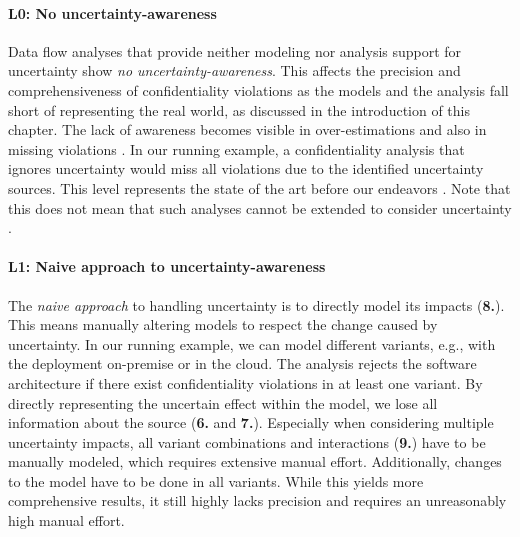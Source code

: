 \paragraph{L0: No uncertainty-awareness}\label{awarenesslevel:0}
Data flow analyses that provide neither modeling nor analysis support for uncertainty show \emph{no uncertainty-awareness}.
This affects the precision and comprehensiveness \cite{hahner_architectural_2021} of confidentiality violations as the models and the analysis fall short of representing the real world, as discussed in the introduction of this chapter.
The lack of awareness becomes visible in over-estimations and also in missing violations \cite{seifermann_architectural_2022}.
In our running example, a confidentiality analysis that ignores uncertainty would miss all violations due to the identified uncertainty sources.
This level represents the state of the art before our endeavors \cite{seifermann_architectural_2022,hahner_dealing_2021,seifermann_detecting_2022}.
Note that this does not mean that such analyses cannot be extended to consider uncertainty \cite{hahner_dealing_2021}.


\paragraph{L1: Naive approach to uncertainty-awareness}\label{awarenesslevel:1}
The \emph{naive approach} to handling uncertainty is to directly model its impacts (\textbf{8.}).
This means manually altering models to respect the change caused by uncertainty.
In our running example, we can model different variants, e.g., with the deployment on-premise or in the cloud.
The analysis rejects the software architecture if there exist confidentiality violations in at least one variant.
By directly representing the uncertain effect within the model, we lose all information about the source (\textbf{6.} and \textbf{7.}).
Especially when considering multiple uncertainty impacts, all variant combinations and interactions (\textbf{9.}) have to be manually modeled, which requires extensive manual effort. 
Additionally, changes to the model have to be done in all variants.
While this yields more comprehensive results, it still highly lacks precision \cite{bitschi_uncertainty-aware_2022} and requires an unreasonably high manual effort.


